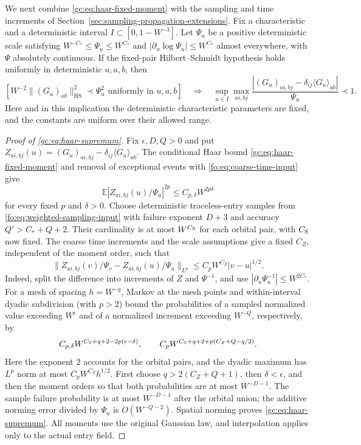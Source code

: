 \documentclass[11pt]{article}
\numberwithin{equation}{section}
\theoremstyle{remark}
\newcommand{\E}{\mathbb E}
\newcommand{\HS}{\mathrm{HS}}
\begin{document}
We next combine \eqref{gc:eq:haar-fixed-moment} with the sampling and
time increments of Section~\ref{sec:sampling-propagation-extensions}.
Fix a characteristic and a deterministic interval $I\subset[0,1-W^{-3}]$.
Let $\Psi_u$ be a positive deterministic scale satisfying
$W^{-C_*}\le\Psi_u\le W^{C_*}$ and
$|\partial_u\log\Psi_u|\le W^{C_*}$ almost everywhere, with
$\Psi$ absolutely continuous. If the fixed-pair Hilbert--Schmidt
hypothesis holds uniformly in deterministic $u,a,b$, then
\begin{equation}\label{gc:eq:haar-supremum}
 \left[W^{-2}\|(G_u)_{ab}\|_{\HS}^2\prec\Psi_u^2
       \text{ uniformly in }u,a,b\right]
 \quad\Longrightarrow\quad
 \sup_{u\in I}\max_{ai,bj}
 \frac{|(G_u)_{ai,bj}-\delta_{ij}\langle G_u\rangle_{ab}|}
      {\Psi_u}\prec1.
\end{equation}
Here and in this implication the deterministic characteristic parameters
are fixed, and the constants are uniform over their allowed range.

\begin{proof}[Proof of \eqref{gc:eq:haar-supremum}]
Fix $\epsilon,D,Q>0$ and put
$Z_{ai,bj}(u)=(G_u)_{ai,bj}-\delta_{ij}\langle G_u\rangle_{ab}$.
The conditional Haar bound \eqref{gc:eq:haar-fixed-moment} and removal
of exceptional events with \eqref{fo:eq:coarse-time-input} give
\[
 \E|Z_{ai,bj}(u)/\Psi_u|^{2p}\le C_{p,\delta}W^{2p\delta}
\]
for every fixed $p$ and $\delta>0$.
Choose deterministic traceless-entry samples from
\eqref{fo:eq:weighted-sampling-input} with failure exponent $D+3$
and accuracy $Q'>C_*+Q+2$. Their cardinality is at most
$W^{C_{\rm S}}$ for each orbital pair, with $C_{\rm S}$ now fixed.
The coarse time increments and the scale assumptions give a fixed
$C_Z$, independent of the moment order, such that
\[
 \|Z_{ai,bj}(v)/\Psi_v-Z_{ai,bj}(u)/\Psi_u\|_{L^p}
 \le C_pW^{C_Z}|v-u|^{1/2}.
\]
Indeed, split the difference into increments of $Z$ and $\Psi^{-1}$,
and use $|\partial_u\Psi_u^{-1}|\le W^{2C_*}$.
For a mesh of spacing $h=W^{-q}$, Markov at the mesh points and
within-interval dyadic subdivision (with $p>2$) bound the probabilities
of a sampled normalized value exceeding $W^\epsilon$ and of a normalized
increment exceeding $W^{-Q}$, respectively, by
\[
 C_{p,\delta}W^{C_{\rm S}+q+2-2p(\epsilon-\delta)},
 \qquad C_pW^{C_{\rm S}+q+2+p(C_Z+Q-q/2)}.
\]
Here the exponent $2$ accounts for the orbital pairs, and the dyadic
maximum has $L^p$ norm at most $C_pW^{C_Z}h^{1/2}$.
First choose $q>2(C_Z+Q+1)$, then $\delta<\epsilon$, and then the
moment orders so that both probabilities are at most $W^{-D-1}$.
The sample failure probability is at most $W^{-D-1}$ after the
orbital union; the additive norming error divided by $\Psi_u$ is
$O(W^{-Q-2})$. Spatial norming proves
\eqref{gc:eq:haar-supremum}. All moments use the original Gaussian law,
and interpolation applies only to the actual entry field.
\end{proof}
\end{document}
